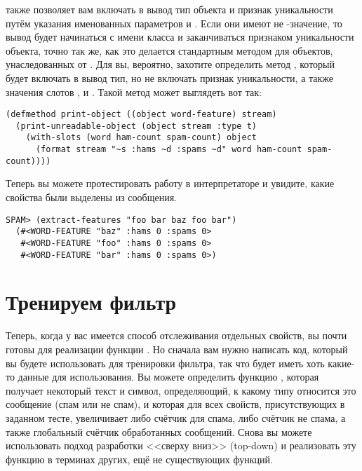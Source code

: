  также позволяет вам включать в вывод тип объекта и признак
уникальности путём указания именованных параметров  и
.  Если они имеют не -значение, то вывод будет начинаться с имени
класса и заканчиваться признаком уникальности объекта, точно так же, как
это делается стандартным методом  для объектов, унаследованных от
.  Для  вы, вероятно, захотите определить метод
, который будет включать в вывод тип, но не включать признак
уникальности, а также значения слотов ,  и
.  Такой метод может выглядеть вот так:

\begin{lstlisting}
(defmethod print-object ((object word-feature) stream)
  (print-unreadable-object (object stream :type t)
    (with-slots (word ham-count spam-count) object
      (format stream "~s :hams ~d :spams ~d" word ham-count spam-count))))
\end{lstlisting}

Теперь вы можете протестировать работу  в интерпретаторе и увидите,
какие свойства были выделены из сообщения.

\begin{lstlisting}[style=lisprepl]
  SPAM> (extract-features "foo bar baz foo bar")
  (#<WORD-FEATURE "baz" :hams 0 :spams 0>
   #<WORD-FEATURE "foo" :hams 0 :spams 0>
   #<WORD-FEATURE "bar" :hams 0 :spams 0>)
\end{lstlisting}

\section{Тренируем фильтр}

Теперь, когда у вас имеется способ отслеживания отдельных свойств, вы почти готовы для
реализации функции .  Но сначала вам нужно написать код, который вы будете
использовать для тренировки фильтра, так что  будет иметь хоть какие-то данные
для использования.  Вы можете определить функцию , которая получает некоторый
текст и символ, определяющий, к какому типу относится это сообщение (спам или не спам), и
которая для всех свойств, присутствующих в заданном тесте, увеличивает либо счётчик для
спама, либо счётчик не спама, а также глобальный счётчик обработанных сообщений.  Снова
вы можете использовать подход разработки <<сверху вниз>> (top-down) и реализовать эту
функцию в терминах других, ещё не существующих функций.

